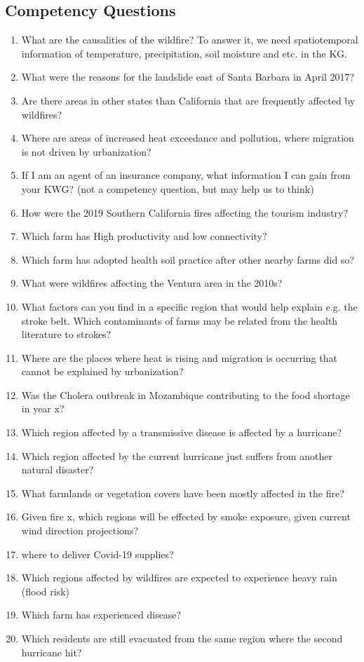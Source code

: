 \subsection{Competency Questions}
\label{ssec:cqs}
\begin{enumerate}[\phantom{CQ }CQ 1.]
	\item What are the causalities of the wildfire? To answer it, we need spatiotemporal information of temperature, precipitation, soil moisture and etc. in the KG.
	\item What were the reasons for the landslide east of Santa Barbara in April 2017?
	\item Are there areas in other states than California that are frequently affected by wildfires?
	\item Where are areas of increased heat exceedance and pollution, where migration is not driven by urbanization?
	\item If I am an agent of an insurance company, what information I can gain from your KWG? (not a competency question, but may help us to think)
	\item How were the 2019 Southern California fires affecting the tourism industry?
	\item Which farm has High productivity and low connectivity?
	\item Which farm has adopted health soil practice after other nearby farms did so?
	\item What were wildfires affecting the Ventura area in the 2010s?
	\item What factors can you find in a specific region that would help explain e.g. the stroke belt. Which contaminants of farms may be related from the health literature to strokes?
	\item Where are the places where heat is rising and migration is occurring that cannot be explained by urbanization?
	\item Was the Cholera outbreak in Mozambique contributing to the food shortage in year x?
	\item Which region affected by a transmissive disease is affected by a hurricane?
	\item Which region affected by the current hurricane just suffers from another natural disaster?
	\item What farmlands or vegetation covers have been mostly affected in the fire?
	\item Given fire x, which regions will be effected by smoke exposure, given current wind direction projections?
	\item where to deliver Covid-19 supplies?
	\item Which regions affected by wildfires are expected to experience heavy rain (flood risk)
	\item Which farm has experienced disease?
	\item Which residents are still evacuated from the same region where the second hurricane hit?
\end{enumerate}

